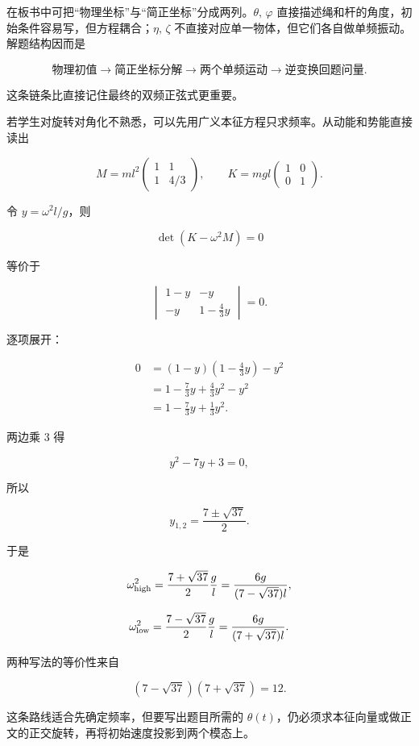 \documentclass[12pt,a4paper,UTF8]{ctexart}
\begin{document}
在板书中可把``物理坐标''与``简正坐标''分成两列。\(\theta,\,\varphi\)
直接描述绳和杆的角度，初始条件容易写，但方程耦合；\(\eta,\,\zeta\)
不直接对应单一物体，但它们各自做单频振动。解题结构因而是

\[
\text{物理初值}
\longrightarrow
\text{简正坐标分解}
\longrightarrow
\text{两个单频运动}
\longrightarrow
\text{逆变换回题问量}.
\]

这条链条比直接记住最终的双频正弦式更重要。

若学生对旋转对角化不熟悉，可以先用广义本征方程只求频率。从动能和势能直接读出

\[
M=ml^2
\begin{pmatrix}
1&1\\
1&4/3
\end{pmatrix},
\qquad
K=mgl
\begin{pmatrix}
1&0\\
0&1
\end{pmatrix}.
\]

令 \(y=\omega^2l/g\)，则

\[
\det(K-\omega^2M)=0
\]

等价于

\[
\begin{vmatrix}
1-y&-y\\
-y&1-\frac43y
\end{vmatrix}=0.
\]

逐项展开：

\[
\begin{aligned}
0
&=(1-y)\left(1-\frac43y\right)-y^2\\
&=1-\frac73y+\frac43y^2-y^2\\
&=1-\frac73y+\frac13y^2.
\end{aligned}
\]

两边乘 \(3\) 得

\[
y^2-7y+3=0,
\]

所以

\[
y_{1,2}=\frac{7\pm\sqrt{37}}2.
\]

于是

\[
\omega_{\rm high}^2
=\frac{7+\sqrt{37}}2\frac gl
=\frac{6g}{(7-\sqrt{37})l},
\]

\[
\omega_{\rm low}^2
=\frac{7-\sqrt{37}}2\frac gl
=\frac{6g}{(7+\sqrt{37})l}.
\]

两种写法的等价性来自

\[
(7-\sqrt{37})(7+\sqrt{37})=12.
\]

这条路线适合先确定频率，但要写出题目所需的
\(\theta(t)\)，仍必须求本征向量或做正文的正交旋转，再将初始速度投影到两个模态上。
\end{document}
